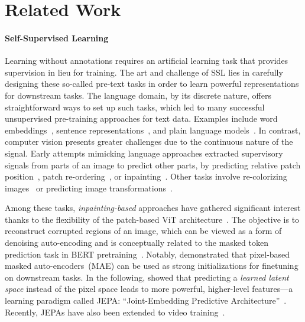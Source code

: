 \section{Related Work}

\paragraph{Self-Supervised Learning}
Learning without annotations requires an artificial learning task that provides supervision in lieu for training.
The art and challenge of SSL lies in carefully designing these so-called pre-text tasks in order to learn powerful representations for downstream tasks.
The language domain, by its discrete nature, offers straightforward ways to set up such tasks, which led to many successful unsupervised pre-training approaches for text data.
Examples include word embeddings~\citep{mikolov2013distributed,bojanowski2017enriching}, sentence representations~\citep{devlin2018bert,liu2019roberta}, and plain language models~\citep{mikolov2010recurrent,zaremba2014recurrent}.
In contrast, computer vision presents greater challenges due to the continuous nature of the signal. 
Early attempts mimicking language approaches extracted supervisory signals from parts of an image to predict other parts, \eg by predicting relative patch position~\citep{doersch2015unsupervised}, patch re-ordering~\citep{noroozi2016jigsaw, misra2020self}, or inpainting~\citep{pathakCVPR16context}.
Other tasks involve re-colorizing images~\citep{zhang2016colorful} or predicting image transformations~\citep{gidaris2018unsupervised}.


Among these tasks, \emph{inpainting-based} approaches have gathered significant interest thanks to the flexibility of the patch-based ViT architecture~\citep{he2021masked, bao2021beit, el2021large}.
The objective is to reconstruct corrupted regions of an image, which can be viewed as a form of denoising auto-encoding and is conceptually related to the masked token prediction task in BERT pretraining~\citep{devlin2018bert}.
Notably, \citet{he2021masked} demonstrated that pixel-based masked auto-encoders~(MAE) can be used as strong initializations for finetuning on downstream tasks.
In the following, \citet{baevski2022data2vec,baevski2023efficient,assran2023self} showed that predicting a \emph{learned latent space} instead of the pixel space leads to more powerful, higher-level features---a learning paradigm called JEPA: ``Joint-Embedding Predictive Architecture''~\citep{lecun2022path}.
Recently, JEPAs have also been extended to video training~\citep{bardes2024revisiting,assran2025vjepa2}.


